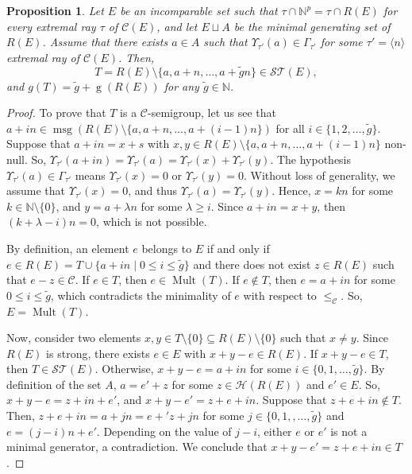 \documentclass[a4paper,11pt]{article}
\newtheorem{proposition}[theorem]{Proposition}
\def\CaH{\mathcal{H}}
\def\CaC{\mathcal{C}}
\def\N{\mathbb{N}}
\def\msg{\operatorname{msg}}
\def\g{\operatorname{g}}
\def\Mult{\operatorname{Mult}}
\begin{document}
{\begin{proposition}\label{AconLineaMinimal}
Let $E$ be an incomparable set such that $\tau\cap \N^p =  \tau\cap R(E)$ for every extremal ray $\tau$ of $\CaC(E)$, and let $E\sqcup A$ be the minimal generating set of $R(E)$. Assume that there exists $a\in A$ such that $\Upsilon _{\tau '}(a)\in \Gamma _{\tau '}$ for some $\tau'=\langle n \rangle$ extremal ray of $\CaC(E)$. Then,
\[
T=R(E)\setminus\{a,a+n,\ldots , a+\tilde{g}n\}\in \mathcal{ST}(E),
\]
and $g(T)=\tilde{g}+\g(R(E))$ for any $\tilde{g}\in \N$.
\end{proposition}

\begin{proof}
To prove that $T$ is a $\CaC$-semigroup, let us see that $a+in\in \msg(R(E)\setminus\{a,a+n,\ldots ,a+(i-1)n\})$ for all $i\in\{1, 2, \ldots, \tilde{g}\}$. Suppose that $a+in=x+s$ with $x,y\in R(E)\setminus\{a,a+n,\ldots ,a+(i-1)n\}$ non-null. So, $\Upsilon_{\tau'}(a+in)=\Upsilon_{\tau'} (a)= \Upsilon_{\tau'}(x)+\Upsilon_{\tau'}(y)$. The hypothesis $\Upsilon _{\tau '}(a)\in \Gamma _{\tau '}$ means $\Upsilon_{\tau'}(x)=0$ or $\Upsilon_{\tau'}(y)=0$. Without loss of generality, we assume that $\Upsilon_{\tau'}(x)=0$, and  thus $\Upsilon_{\tau'} (a)=\Upsilon_{\tau'}(y)$. Hence, $x=kn$ for some $k\in \N\setminus \{0\}$, and $y=a+\lambda n$ for some $\lambda\ge i$. Since $a+in=x+y$, then $(k+\lambda -i)n=0$, which is not possible.

By definition, an element $e$ belongs to $E$ if and only if $e \in R(E)=T \cup \{a+in \mid 0 \leq i \leq \tilde{g}\}$ and there does not exist $z \in R(E)$ such that $e - z \in \CaC$.
If $e \in T$, then $e \in \Mult(T)$.  If $e \notin T$, then $e = a + in$ for some $0 \leq i \leq \tilde{g}$, which contradicts the minimality of $e$ with respect to $\leq_{\CaC}$. So, $E=\Mult(T)$.

Now, consider two elements $x,y\in T\setminus\{0\}\subseteq R(E)\setminus\{0\}$ such that $x\neq y$.  Since $R(E)$ is strong, there exists $e\in E$ with $x+y-e\in R(E)$. If $x+y-e\in T$, then $T\in \mathcal{ST}(E)$. Otherwise, $x+y-e=a+in$ for some $i\in \{0,1,\ldots, \tilde{g}\}$.
By definition of the set $A$, $a=e'+z$ for some $z\in \CaH(R(E))$ and $e'\in E$. So, $x+y-e=z+in+e'$, and $x+y-e'=z+e+in$. Suppose that $z+e+in\notin T$. Then, $z+e+in=a+jn=e+'z+jn$ for some $j\in\{0,1,, \ldots, \tilde{g}\}$ and $e=(j-i)n+e'$.
Depending on the value of $j-i$, either $e$ or $e'$ is not a minimal generator, a contradiction. We conclude that $x+y-e'=z+e+in\in T$.
\end{proof}

}
\end{document}
